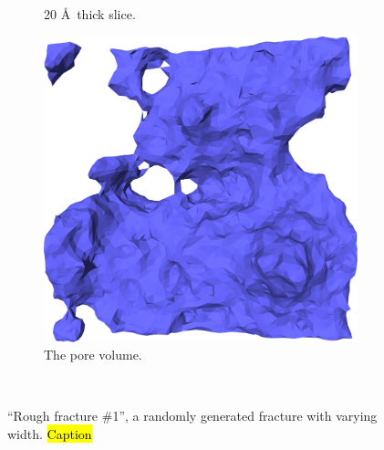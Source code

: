 \begin{figure}[!p]
{\begin{subfigure}[t]{\myfigwidth}
        \caption{20 \AA\ thick slice.}%
    \end{subfigure}%
    \hspace{\myhfillwidth}%
    \begin{subfigure}[t]{\myfigwidth}%
        \centering%
        \includegraphics[width=\textwidth]{images/systems/trimmed-rough_fracture01_abel_22}%
        \caption{The pore volume.}%
    \end{subfigure}%
}%
    \vspace{10pt}\\%
    \caption{%
        ``Rough fracture \#1'', a randomly generated fracture with varying width. \hl{Caption} %
        \label{fig:renderings_rough_fracture01_abel}%
    }%
\end{figure}%

